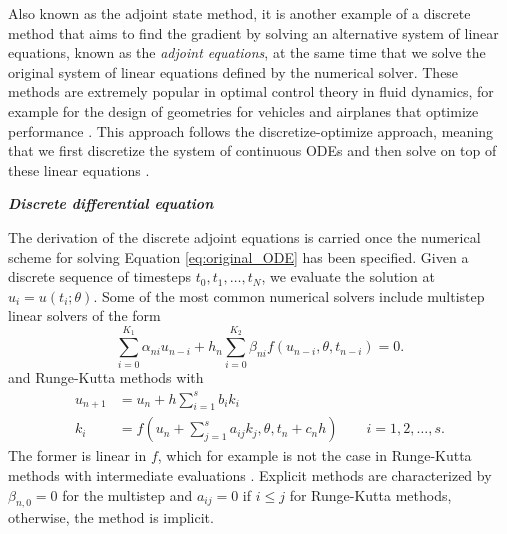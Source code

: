 Also known as the adjoint state method, it is another example of a discrete method that aims to find the gradient by solving an alternative system of linear equations, known as the \textit{adjoint equations}, at the same time that we solve the original system of linear equations defined by the numerical solver. 
These methods are extremely popular in optimal control theory in fluid dynamics, for example for the design of geometries for vehicles and airplanes that optimize performance \cite{Elliott_Peraire_1996, Giles_Pierce_2000}.
This approach follows the discretize-optimize approach, meaning that we first discretize the system of continuous ODEs and then solve on top of these linear equations \cite{Giles_Pierce_2000, allaire2015review}. 



\vspace*{10px}
\noindent \textbf{\textit{Discrete differential equation}}
\vspace*{5px}


The derivation of the discrete adjoint equations is carried once the numerical scheme for solving Equation \eqref{eq:original_ODE} has been specified.  
Given a discrete sequence of timesteps $t_0, t_1, \ldots, t_N$, we evaluate the solution at $u_i = u(t_i; \theta)$. 
Some of the most common numerical solvers include multistep linear solvers of the form 
\begin{equation}
    \sum_{i=0}^{K_1} \alpha_{ni} u_{n-i} 
    +
    h_n \sum_{i=0}^{K_2} \beta_{ni} f(u_{n-i}, \theta, t_{n-i})
    = 
    0.
\end{equation}
and Runge-Kutta methods with 
\begin{align}
    u_{n+1} 
    &= 
    u_n 
    + 
    h \sum_{i=1}^s b_i k_i \\
    k_i 
    &= 
    f \left(u_n + \sum_{j=1}^s a_{ij} k_j , \theta ,  t_n + c_n h \right) \qquad i=1,2, \ldots, s.
\end{align}
The former is linear in $f$, which for example is not the case in Runge-Kutta methods with intermediate evaluations \cite{ascher2008numerical}.
Explicit methods are characterized by $\beta_{n, 0} = 0$ for the multistep and $a_{ij}=0$ if $i \leq j$ for Runge-Kutta methods, otherwise, the method is implicit. 

